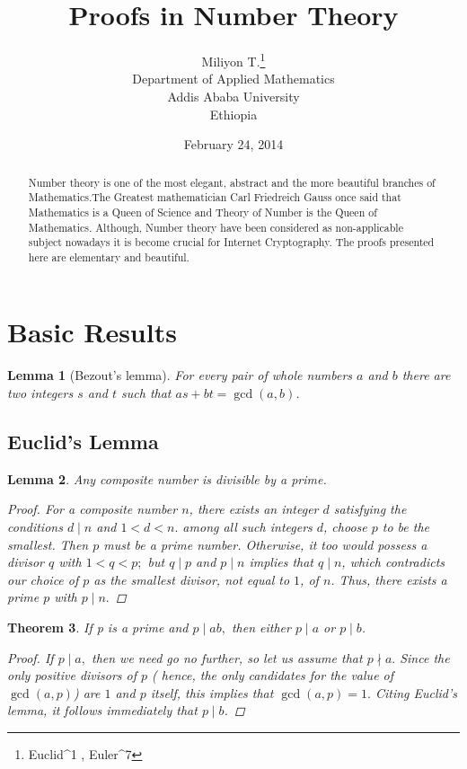 \documentclass[12pt]{article}
\newtheorem{thm}{Theorem}[section]
\newtheorem{lem}[thm]{Lemma}
\begin{document}
\title{Proofs in Number Theory}
\author{Miliyon T.\thanks{Euclid^1 , Euler^7} \\
Department of Applied Mathematics  \\
Addis Ababa University \\
Ethiopia}
\date{February 24, 2014}
\maketitle

\begin{abstract}
  Number theory is one of the most elegant, abstract and the more beautiful branches of Mathematics.The Greatest mathematician Carl Friedreich Gauss once said that Mathematics is a Queen of Science and Theory of Number is the Queen of Mathematics. Although, Number theory have been considered as non-applicable subject nowadays it is become crucial for Internet Cryptography. The proofs presented here are elementary and beautiful.
\end{abstract}
\section{Basic Results}
\begin{lem}[Bezout's lemma]
For every pair of whole numbers $a$ and $b$ there are two integers $s$ and $t$ such that $as + bt = \gcd(a, b)$.
\end{lem}

\subsection{Euclid's Lemma}
\begin{lem}
\textit{Any composite number is divisible by a prime.}
\begin{proof}
For a composite number $n$, there exists an integer $d$ satisfying the conditions $d\mid{n}$ and $1<d<n.$ among all such integers $d$, choose $p$ to be the smallest. Then $p$ must be a prime number. Otherwise, it too would possess a divisor $q$ with $1<q<p;$ but $q\mid{p}$ and $p\mid{n}$ implies that $q\mid{n}$, which contradicts our choice of $p$ as the smallest divisor, not equal to $1$, of $n$. Thus, there exists a prime $p$ with $p\mid{n}.$
\end{proof}
\end{lem}
\begin{thm}
\textit{If p is a prime and $p\mid{ab},$ then either $p\mid{a}$ or $p\mid{b}$.}

\begin{proof}
If $p\mid{a},$ then we need go no further, so let us assume that $p\nmid{a}.$ Since the only positive divisors of $p$ ( hence, the only candidates for the value of $\gcd (a,p)$) are $1$ and $p$ itself, this implies that $\gcd (a,p)=1.$ Citing Euclid’s lemma, it follows immediately that $p\mid{b}$.
\end{proof}
\end{thm}
\end{document}
